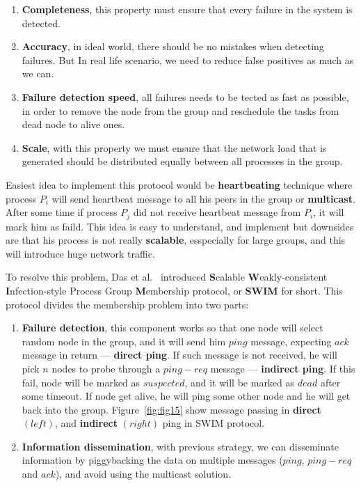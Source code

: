 \begin{enumerate}[start=1,label={(\bfseries \arabic*)}] \label{ds:features}
	\item \textbf{Completeness}, this property must ensure that every failure in the system is detected.
	\item \textbf{Accuracy}, in ideal world, there should be no mistakes when detecting failures. But In real life scenario, we need to reduce false positives as much as we can.
	\item \textbf{Failure detection speed}, all failures needs to be tected as fast as possible, in order to remove the node from the group and reschedule the tasks from dead node to alive ones.
	\item \textbf{Scale}, with this property we must ensure that the network load that is generated should be distributed equally between all processes in the group.
\end{enumerate}

Easiest idea to implement this protocol would be \textbf{heartbeating} technique where process $P_i$ will send heartbeat message to all his peers in the group or \textbf{multicast}. After some time if process $P_j$ did not receive heartbeat message from $P_i$, it will mark him as faild. This idea is easy to understand, and implement but downsides are that his process is not really \textbf{scalable}, esspecially for large groups, and this will introduce huge network traffic.

To resolve this problem, Das et al.~\cite{DasGM02} introduced \textbf{S}calable \textbf{W}eakly-consistent \textbf{I}nfection-style Process Group \textbf{M}embership protocol, or \textbf{SWIM} for short. This protocol divides the membership problem into two parts:

\begin{enumerate}[start=1,label={(\bfseries \arabic*)}]
	\item \textbf{Failure detection}, this component works so that one node will select random node in the group, and it will send him $ping$ message, expecting $ack$ message in return --- \textbf{direct ping}. If such message is not received, he will pick $n$ nodes to probe through a $ping-req$ message --- \textbf{indirect ping}. If this fail, node will be marked as $suspected$, and it will be marked as $dead$ after some timeout. If node get alive, he will ping some other node and he will get back into the group. Figure~\ref{fig:fig15} show message passing in \textbf{direct} $(left)$, and \textbf{indirect} $(right)$ ping in SWIM protocol.
	\item \textbf{Information dissemination}, with previous strategy, we can disseminate information by piggybacking the data on multiple messages ($ping$, $ping-req$ and $ack$), and avoid using the multicast solution.
\end{enumerate}

